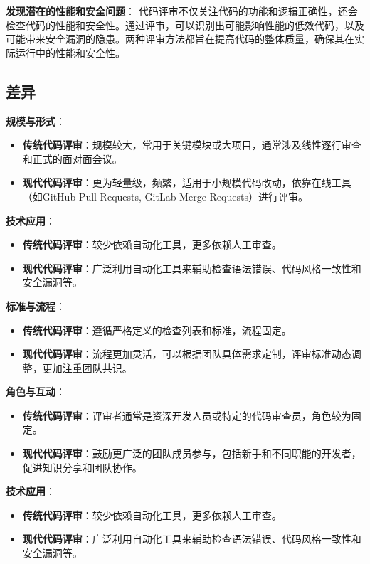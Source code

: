 \documentclass{article}
\begin{document}
\textbf{发现潜在的性能和安全问题}：
代码评审不仅关注代码的功能和逻辑正确性，还会检查代码的性能和安全性。通过评审，可以识别出可能影响性能的低效代码，以及可能带来安全漏洞的隐患。两种评审方法都旨在提高代码的整体质量，确保其在实际运行中的性能和安全性。


\subsection{差异}

\textbf{规模与形式}：
\begin{itemize}
    \item \textbf{传统代码评审}：规模较大，常用于关键模块或大项目，通常涉及线性逐行审查和正式的面对面会议。
    \item \textbf{现代代码评审}：更为轻量级，频繁，适用于小规模代码改动，依靠在线工具（如GitHub Pull Requests, GitLab Merge Requests）进行评审。
\end{itemize}

\textbf{技术应用}：
\begin{itemize}
    \item \textbf{传统代码评审}：较少依赖自动化工具，更多依赖人工审查。
    \item \textbf{现代代码评审}：广泛利用自动化工具来辅助检查语法错误、代码风格一致性和安全漏洞等。
\end{itemize}

\textbf{标准与流程}：
\begin{itemize}
    \item \textbf{传统代码评审}：遵循严格定义的检查列表和标准，流程固定。
    \item \textbf{现代代码评审}：流程更加灵活，可以根据团队具体需求定制，评审标准动态调整，更加注重团队共识。
\end{itemize}

\textbf{角色与互动}：
\begin{itemize}
    \item \textbf{传统代码评审}：评审者通常是资深开发人员或特定的代码审查员，角色较为固定。
    \item \textbf{现代代码评审}：鼓励更广泛的团队成员参与，包括新手和不同职能的开发者，促进知识分享和团队协作。
\end{itemize}


\textbf{技术应用}：
\begin{itemize}
    \item \textbf{传统代码评审}：较少依赖自动化工具，更多依赖人工审查。
    \item \textbf{现代代码评审}：广泛利用自动化工具来辅助检查语法错误、代码风格一致性和安全漏洞等。
\end{itemize}
\end{document}
